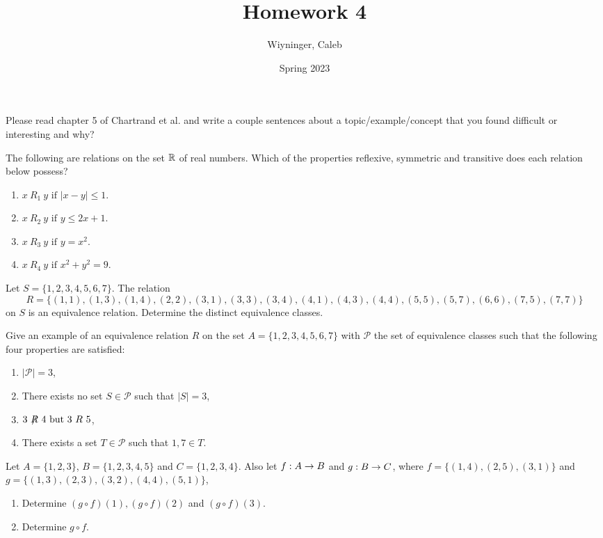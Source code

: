 \documentclass{homework}
\author{Wiyninger, Caleb}  %
\date{Spring 2023}  %
\title{Homework 4}
\begin{document}
 \maketitle

\question Please read chapter 5 of Chartrand et al. and write a couple sentences about a topic/example/concept that you found difficult or interesting and why?


\question The following are relations on the set $\mathbb{R}$ of real numbers. Which of the properties reflexive, symmetric and transitive does each relation below possess?
\begin{enumerate}[label=(\alph*)]
	\item $x \ R_1 \ y \text{ if } |x - y| \leq 1$.
	\item $x \ R_2 \ y \text{ if } y \leq 2x + 1$.
	\item $x \ R_3 \ y \text{ if } y = x^2$.
	\item $x \ R_4 \ y \text{ if } x^2 + y^2 = 9$.
\end{enumerate}

\question Let $S = \{1,2,3,4,5,6,7\}$. The relation
\[
	R = \{(1, 1),(1, 3),(1, 4),(2, 2),(3, 1),(3, 3),(3, 4),(4, 1),(4, 3),(4, 4),(5, 5),(5, 7),(6, 6),(7, 5),(7, 7)\}
\]
on $S$ is an equivalence relation. Determine the distinct equivalence classes.


\question Give an example of an equivalence relation $R$ on the set $A = \{1, 2, 3, 4, 5, 6, 7\}$ with $\mathcal{P}$ the set of equivalence classes such that the following four properties are satisfied:

\begin{enumerate}
	\item $|\mathcal{P}| = 3$,
	\item There exists no set $S \in \mathcal{P}$ such that $|S| = 3$,
	\item $3 \ \mathord{\not\mathrel{R}} \ 4 \text{ but } 3 \ R \ 5$,
	\item There exists a set $T \in \mathcal{P}$ such that $1, 7 \in T$.
\end{enumerate}

\question Let $A = \{1, 2, 3\}$, $B = \{1, 2, 3, 4, 5\}$ and $C = \{1, 2, 3, 4\}$. Also let $f : A \rightarrow B$ and $g : B \rightarrow C$, where $f = \{(1, 4), (2, 5), (3, 1)\}$ and $g = \{(1, 3), (2, 3), (3, 2), (4, 4), (5, 1)\}$,
\begin{enumerate}[label=(\alph*)]
    \item Determine $(g \circ f )(1), (g \circ f )(2)$ and $(g \circ f )(3)$.
    \item Determine $g \circ f$.
\end{enumerate}
\end{document}
